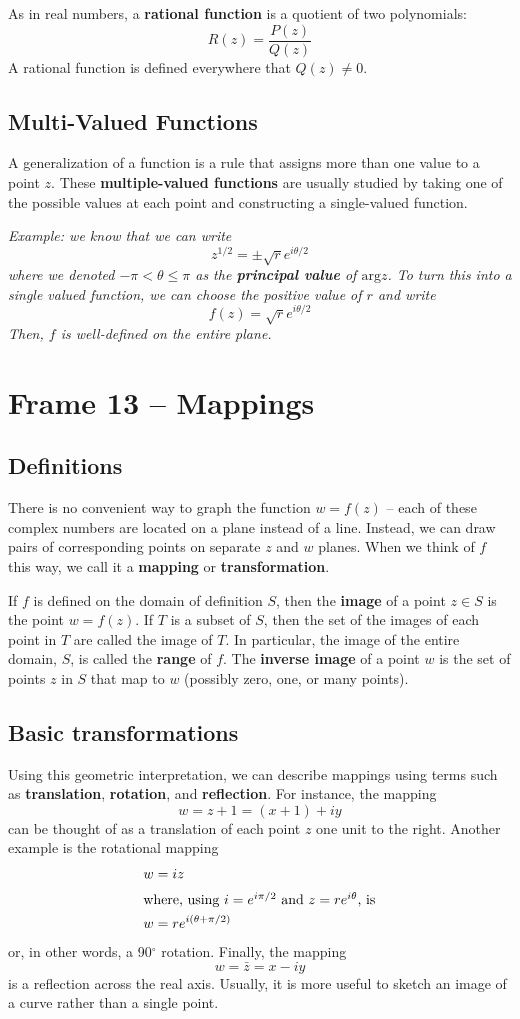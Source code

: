 \documentclass{article}
\renewcommand{\emph}{\textbf}
\begin{document}
As in real numbers, a \emph{rational function} is a quotient of two polynomials:
\[
	R(z) = \frac{P(z)}{Q(z)}
\]
A rational function is defined everywhere that $Q(z) \neq 0$. 


\subsection{Multi-Valued Functions}
A generalization of a function is a rule that assigns more than one value to a point $z$. These \emph{multiple-valued functions} are usually studied by taking one of the possible values at each point and constructing a single-valued function.

\textit{Example: we know that we can write
\[
	z^{1/2} = \pm \sqrt{r} e^{i\theta/2}
\]
where we denoted $-\pi < \theta \leq \pi$ as the \emph{principal value} of $\text{arg} z$. To turn this into a single valued function, we can choose the positive value of $r$ and write
\[
	f(z) = \sqrt{r} e^{i\theta / 2}
\]
Then, $f$ is well-defined on the entire plane.
}


\clearpage
\section{Frame 13 -- Mappings}
\subsection{Definitions}
There is no convenient way to graph the function $w = f(z)$ -- each of these complex numbers are located on a plane instead of a line. Instead, we can draw pairs of corresponding points on separate $z$ and $w$ planes. When we think of $f$ this way, we call it a \emph{mapping} or \emph{transformation}.

If $f$ is defined on the domain of definition $S$, then the \emph{image} of a point $z \in S$ is the point $w = f(z)$. If $T$ is a subset of $S$, then the set of the images of each point in $T$ are called the image of $T$. In particular, the image of the entire domain, $S$, is called the \emph{range} of $f$. The \emph{inverse image} of a point $w$ is the set of points $z$ in $S$ that map to $w$ (possibly zero, one, or many points).

\subsection{Basic transformations}
Using this geometric interpretation, we can describe mappings using terms such as \emph{translation}, \emph{rotation}, and \emph{reflection}. For instance, the mapping
\[
	w = z + 1 = (x + 1) + iy
\]
can be thought of as a translation of each point $z$ one unit to the right. Another example is the rotational mapping
\begin{align*}
	w &= iz \\
\intertext{where, using $i = e^{i\pi/2}$ and $z = re^{i\theta}$, is}
	w &= r e^{i(\theta + \pi/2)}
\end{align*}
or, in other words, a 90$^\circ$ rotation. Finally, the mapping
\[
	w = \bar{z} = x - iy
\]
is a reflection across the real axis. Usually, it is more useful to sketch an image of a curve rather than a single point. 
\end{document}
